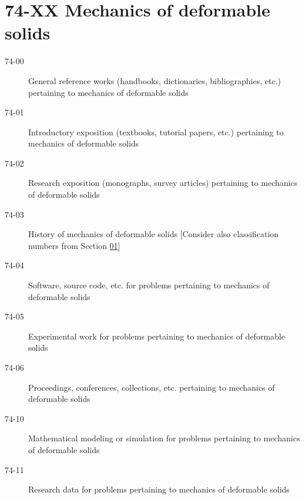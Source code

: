 \documentclass[letterpaper]{article}
\begin{document}
\section*{74-XX Mechanics of deformable solids }\label{74-XX}
\begin{description}
\item [74-00]\label{74-00} General reference works (handbooks, dictionaries, bibliographies, etc.) pertaining to mechanics of deformable solids
\item [74-01]\label{74-01} Introductory exposition (textbooks, tutorial papers, etc.) pertaining to mechanics of deformable solids
\item [74-02]\label{74-02} Research exposition (monographs, survey articles) pertaining to mechanics of deformable solids
\item [74-03]\label{74-03} History of mechanics of deformable solids [Consider also classification numbers from Section \hyperref[01-XX]{01}]
\item [74-04]\label{74-04} Software, source code, etc. for problems pertaining to mechanics of deformable solids
\item [74-05]\label{74-05} Experimental work for problems pertaining to mechanics of deformable solids
\item [74-06]\label{74-06} Proceedings, conferences, collections, etc. pertaining to mechanics of deformable solids
\item [74-10]\label{74-10} Mathematical modeling or simulation for problems pertaining to mechanics of deformable solids
\item [74-11]\label{74-11} Research data for problems pertaining to mechanics of deformable solids
\end{description}
\end{document}
